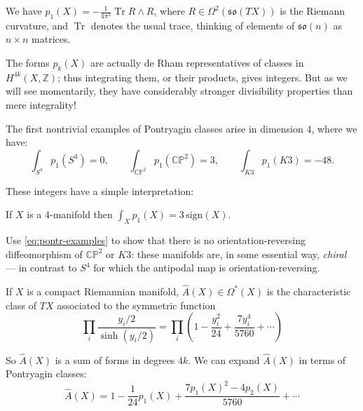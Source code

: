 \documentclass[12pt,letterpaper,reqno]{article}
\numberwithin{equation}{section}
\newcommand{\fso}{{\mathfrak {so}}}
\newcommand{\C}{\ensuremath{\mathbb C}}
\newcommand{\PP}{\ensuremath{\mathbb P}}
\newcommand{\Z}{\ensuremath{\mathbb Z}}
\newcommand{\ti}[1]{\textit{#1}}
\DeclareMathOperator{\Tr}{Tr}
\begin{document}
\begin{example}
We have $p_1(X) = -\frac{1}{4\pi^2} \Tr R \wedge R$, where
$R \in \Omega^2(\fso(TX))$ is the Riemann curvature, and $\Tr$ denotes
the usual trace, thinking of elements of $\fso(n)$ as $n \times n$ matrices.
\end{example}

The forms $p_k(X)$ are actually de Rham representatives of classes in $H^{4k}(X,\Z)$;
thus integrating them, or their products, gives integers.
But as we will see momentarily, they have considerably stronger 
divisibility properties than mere integrality!

\begin{example} The first nontrivial examples of Pontryagin classes arise in
dimension $4$, where we have:
\begin{equation} \label{eq:pontr-examples}
\int_{S^4} p_1(S^4) = 0, \qquad \int_{\C\PP^2} p_1(\C\PP^2) = 3, \qquad \int_{K3} p_1(K3) = -48.
\end{equation}
\end{example}
These integers have a simple interpretation:
\begin{thm} If $X$ is a $4$-manifold then $\int_X p_1(X) = 3 \, {\mathrm{sign}}(X)$.
\end{thm}

\begin{exercise} Use \eqref{eq:pontr-examples} to
show that there is no orientation-reversing diffeomorphism of $\C\PP^2$ or $K3$:
these manifolds are, in some essential way, \ti{chiral} --- in contrast to $S^4$
for which the antipodal map is orientation-reversing.
\end{exercise}

\begin{defn} \label{def:ahat} 
If $X$ is a compact Riemannian manifold, $\hat A(X) \in \Omega^*(X)$
is the characteristic class of $TX$ associated to the symmetric function
\begin{equation}
  \prod_i \frac{y_i/2}{\sinh(y_i/2)} = \prod_i \left( 1 - \frac{y_i^2}{24} + \frac{7 y_i^4}{5760} + \cdots \right)
\end{equation}
\end{defn}
So $\hat A(X)$ is a sum of forms in degrees $4k$.
We can expand $\hat A(X)$ in terms of Pontryagin classes:
\begin{equation}
  \hat A(X) = 1 - \frac{1}{24} p_1(X) + \frac{7 p_1(X)^2 - 4 p_2(X)}{5760} + \cdots
\end{equation}
\end{document}
